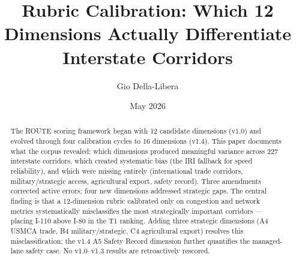 \documentclass[12pt]{article}
\title{Rubric Calibration: Which 12 Dimensions Actually Differentiate Interstate Corridors}
\author{Gio Della-Libera}
\date{May 2026}
\begin{document}
\maketitle
\begin{abstract}
The ROUTE scoring framework began with 12 candidate dimensions (v1.0) and evolved through four calibration cycles to 16 dimensions (v1.4). This paper documents what the corpus revealed: which dimensions produced meaningful variance across 227 interstate corridors, which created systematic bias (the IRI fallback for speed reliability), and which were missing entirely (international trade corridors, military/strategic access, agricultural export, safety record). Three amendments corrected active errors; four new dimensions addressed strategic gaps. The central finding is that a 12-dimension rubric calibrated only on congestion and network metrics systematically misclassifies the most strategically important corridors --- placing I-110 above I-80 in the T1 ranking. Adding three strategic dimensions (A4 USMCA trade, B4 military/strategic, C4 agricultural export) resolves this misclassification; the v1.4 A5 Safety Record dimension further quantifies the managed-lane safety case. No v1.0--v1.3 results are retroactively rescored.
\end{abstract}









\end{document}
